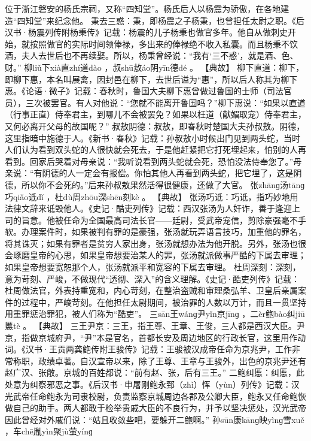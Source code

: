 \documentclass[12pt,UTF8]{ctexbook}
\begin{document}
位于浙江磐安的杨氏宗祠，又称“四知堂”。杨氏后人以杨震为骄傲，在各地建造“四知堂”来纪念他。
秉去三惑：秉，即杨震之子杨秉，也曾担任太尉之职。《后汉书·杨震列传附杨秉传》记载：杨震的儿子杨秉也做官多年。他自从做刺史开始，就按照做官的实际时间领俸禄，多出来的俸禄绝不收入私囊。而且杨秉不饮酒，夫人去世后也不再续娶。所以，杨秉曾经说：“我有‘三不惑’，就是酒、色、财。”
柳liǔ下xià直zhí道dào
，叔shū敖áo阴yīn德dé
。
【典故】
柳下直道：柳下，即柳下惠，本名叫展禽，因封邑在柳下，去世后谥为“惠”，所以后人称其为柳下惠。《论语·微子》记载：春秋时，鲁国大夫柳下惠曾做过鲁国的士师（司法官员），三次被罢官。有人对他说：“您就不能离开鲁国吗？”柳下惠说：“如果以直道（行事正直）侍奉君主，到哪儿不会被罢免？如果以枉道（献媚取宠）侍奉君主，又何必离开父母的故国呢？”
叔敖阴德：叔敖，即春秋时楚国大夫孙叔敖。阴德，这里指暗中施德于人。《新书·春秋》记载：孙叔敖小时候出门见到两头蛇，当时人们认为看到双头蛇的人很快就会死去，于是他赶紧把它打死埋起来，怕别的人再看到。回家后哭着对母亲说：“我听说看到两头蛇就会死，恐怕没法侍奉您了。”母亲说：“有阴德的人一定会有报偿。你怕其他人再看到两头蛇，把它埋了，这是阴德，所以你不会死的。”后来孙叔敖果然活得很健康，还做了大官。
张zhānɡ汤tānɡ巧qiǎo诋dǐ
，杜dù周zhōu深shēn刻kè
。
【典故】
张汤巧诋：巧诋，指巧妙地用法律文辞来诋毁他人。《史记·酷吏列传》记载：西汉张汤为人奸诈，善于逢迎上司的旨意。他被任命为全国最高司法长官——廷尉，受武帝宠信，剪除豪强毫不手软。办理案件时，如果被判有罪的是豪强，张汤就玩弄语言技巧，加重他的罪名，将其诛灭；如果有罪者是贫穷人家出身，张汤就想办法为他开脱。另外，张汤也很会琢磨皇帝的心思，如果皇帝想要治某人的罪，张汤就派做事严酷的下属去审理；如果皇帝想要宽恕那个人，张汤就派平和宽容的下属去审理。
杜周深刻：深刻，意为苛刻、严峻，不做现代“透彻、深入”的含义理解。《史记·酷吏列传》记载：杜周做法官，外表持重宽和，内心苛刻，在整治盗贼和审理桑弘羊、卫皇后亲属案件的过程中，严峻苛刻。在他担任太尉期间，被治罪的人数以万计，而且一贯坚持用重罪惩治罪犯，被人们称为“酷吏”。
三sān王wánɡ尹yǐn京jīnɡ
，二èr鲍bào纠jiū慝tè
。
【典故】
三王尹京：三王，指王尊、王章、王俊，三人都是西汉大臣。尹京，指做京城府尹，“尹”本是官名，首都长安及周边地区的行政长官，这里用作动词。《汉书·王贡两龚鲍传附王骏传》记载：王骏被汉成帝任命为京兆尹，工作非常称职，政绩卓著。自汉宣帝以来，除了王尊、王章与王骏外，出色的京兆尹还有赵广汉、张敞。京城的百姓都说：“前有赵、张，后有三王。”
二鲍纠慝：纠慝，此处意为纠察邪恶之事。《后汉书·申屠刚鲍永郅（zhì）恽（yùn）列传》记载：汉光武帝任命鲍永为司隶校尉，负责监察京城周边各郡及公卿大臣，鲍永又任命鲍恢做自己的助手。两人都敢于检举贵戚大臣的不良行为，并予以坚决惩处，汉光武帝因此曾经对外戚们说：“姑且收敛些吧，要躲开二鲍啊。”
孙sūn康kānɡ映yìnɡ雪xuě
，车chē胤yìn聚jù萤yínɡ
\end{document}
